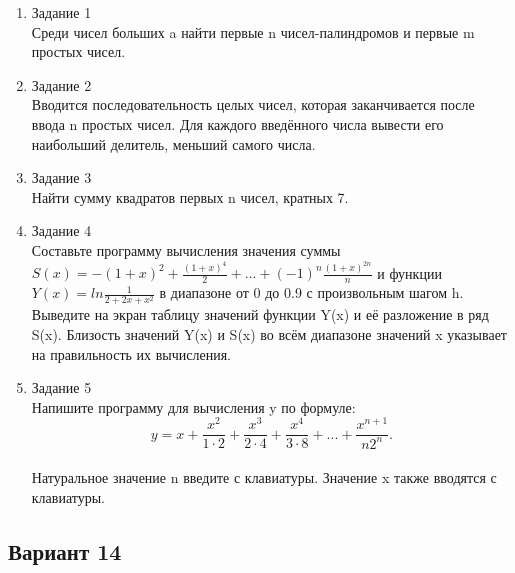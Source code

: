 \documentclass[a4paper]{article}
\begin{document}
	
	\begin{enumerate} 
		\item Задание 1 \\
		Среди чисел больших a найти первые n чисел-палиндромов и первые m простых чисел.\\
		\item Задание 2\\
		Вводится последовательность целых чисел, которая заканчивается после ввода n простых чисел.  Для каждого введённого числа вывести его наибольший делитель, меньший самого числа.\\
		\item Задание 3 \\
		Найти сумму квадратов первых n чисел, кратных 7.\\
		\item Задание 4 \\ 
		Составьте программу вычисления значения суммы  $S(x)=-{(1+x)}^2+\frac{{(1+x)}^4}{2}+...+(-1)^n\frac{{(1+x)}^{2n}}{n}$
		и функции $Y(x)=ln\frac{1}{2+2x+x^2}$ в диапазоне от 0 до 0.9
		с произвольным шагом h. Выведите на экран таблицу значений функции Y(x) и её разложение в ряд S(x). Близость значений Y(x) и S(x) во всём диапазоне
		значений x указывает на правильность их вычисления.\\
		\item Задание 5 \\
		Напишите программу для вычисления y по формуле:\\
		$$y=x+\frac{x^2}{1\cdot2}+\frac{x^3}{2\cdot4}+\frac{x^4}{3\cdot8}+...+\frac{x^{n+1}}{n2^n}.$$\\
		Натуральное значение n введите с клавиатуры. Значение x также вводятся с клавиатуры.\\
		
	\end{enumerate}

		\begin{center}
		\subsection*{Вариант 14}
	\end{center}
	
\end{document}
